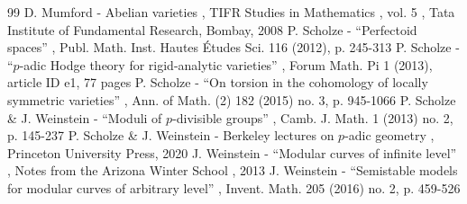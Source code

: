 \documentclass[11pt]{article}
\numberwithin{equation}{section}
\theoremstyle{definition}
\begin{document}
\begin{thebibliography}{99}
 D. Mumford - Abelian varieties , TIFR Studies in Mathematics , vol. 5 , Tata Institute of Fundamental Research, Bombay, 2008
 P. Scholze - “Perfectoid spaces” , Publ. Math. Inst. Hautes Études Sci. 116 (2012), p. 245-313
 P. Scholze - “$p$-adic Hodge theory for rigid-analytic varieties” , Forum Math. Pi 1 (2013), article ID e1, 77 pages
 P. Scholze - “On torsion in the cohomology of locally symmetric varieties” , Ann. of Math. (2) 182 (2015) no. 3, p. 945-1066
 P. Scholze \& J. Weinstein - “Moduli of $p$-divisible groups” , Camb. J. Math. 1 (2013) no. 2, p. 145-237
 P. Scholze \& J. Weinstein - Berkeley lectures on $p$-adic geometry , Princeton University Press, 2020
 J. Weinstein - “Modular curves of infinite level” , Notes from the Arizona Winter School , 2013
 J. Weinstein - “Semistable models for modular curves of arbitrary level” , Invent. Math. 205 (2016) no. 2, p. 459-526
\end{thebibliography}
\end{document}
